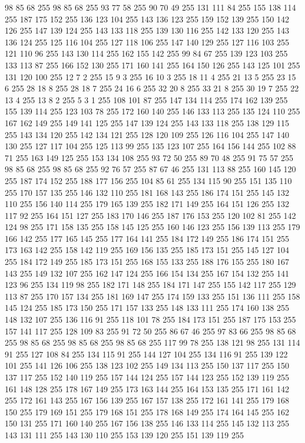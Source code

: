 98 85 68 255 98 85 68 255 93 77 58 255 90 70 49 255 131 111 84 255 155 138 114 255 187 175 152 255 136 123 104 255 143 136 123 255 159 152 139 255 150 142 126 255 147 139 124 255 143 133 118 255 139 130 116 255 142 133 120 255 143 136 124 255 125 116 104 255 127 118 106 255 147 140 129 255 127 116 103 255 121 110 96 255 143 130 114 255 162 155 142 255 99 84 67 255 139 123 103 255 133 113 87 255 166 152 130 255 171 160 141 255 164 150 126 255 143 125 101 255 131 120 100 255 12 7 2 255 15 9 3 255 16 10 3 255 18 11 4 255 21 13 5 255 23 15 6 255 28 18 8 255 28 18 7 255 24 16 6 255 32 20 8 255 33 21 8 255 30 19 7 255 22 13 4 255 13 8 2 255 5 3 1 255 108 101 87 255 147 134 114 255 174 162 139 255 155 139 114 255 123 103 78 255 172 160 140 255 146 133 113 255 135 124 110 255 167 162 149 255 149 141 125 255 147 139 124 255 143 133 118 255 138 129 115 255 143 134 120 255 142 134 121 255 128 120 109 255 126 116 104 255 147 140 130 255
127 117 104 255 125 113 99 255 135 123 107 255 164 156 144 255 102 88 71 255 163 149 125 255 153 134 108 255 93 72 50 255 89 70 48 255 91 75 57 255 98 85 68 255 98 85 68 255 92 76 57 255 87 67 46 255 131 113 88 255 160 145 120 255 187 174 152 255 188 177 156 255 104 85 61 255 134 115 90 255 151 135 110 255 170 157 135 255 146 132 110 255 181 168 143 255 186 174 151 255 145 132 110 255 156 140 114 255 179 165 139 255 182 171 149 255 164 151 126 255 132 117 92 255 164 151 127 255 183 170 146 255 187 176 153 255 120 102 81 255 142 124 98 255 171 158 135 255 158 145 125 255 160 146 123 255 156 139 113 255 179 166 142 255 177 165 145 255 177 164 141 255 184 172 149 255 186 174 151 255 173 163 142 255 158 142 119 255 169 156 135 255 185 173 151 255 145 127 104 255 184 172 149 255 185 173 151 255 168 155 133 255 188 176 155 255 180 167 143 255 149 132 107 255 162 147 124 255 166 154 134 255 167 154 132 255 141 123 96 255 134 119 98 255 182 171 148 255 184 171 147 255 155 142 117 255
129 113 87 255 170 157 134 255 181 169 147 255 174 159 133 255 151 136 111 255 158 145 124 255 185 173 150 255 171 157 133 255 148 133 111 255 174 160 138 255 148 132 107 255 136 116 91 255 118 101 78 255 184 173 151 255 187 175 153 255 157 141 117 255 128 109 83 255 91 72 50 255 86 67 46 255 97 83 66 255 98 85 68 255 98 85 68 255 98 85 68 255 98 85 68 255 117 99 78 255 138 121 98 255 131 114 91 255 127 108 84 255 134 115 91 255 144 127 104 255 134 116 91 255 139 122 101 255 141 126 106 255 138 123 102 255 149 134 113 255 150 137 117 255 150 137 117 255 152 140 119 255 157 144 124 255 157 144 123 255 152 139 119 255 161 148 128 255 178 167 149 255 173 163 144 255 164 153 135 255 171 161 142 255 172 161 143 255 167 156 139 255 167 157 138 255 172 161 141 255 179 168 150 255 179 169 151 255 179 168 151 255 178 168 149 255 174 164 145 255 162 150 131 255 171 160 140 255 167 156 138 255 146 133 114 255 145 132 113 255 143 131 111 255 143 130 110 255 153 139 120 255 151 139 119 255
